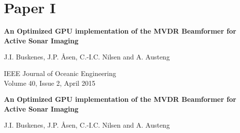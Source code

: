 \ifMonolithic\else\fi


{}



\ifMonolithic\else
   
\fi




\graphicspath{{../HowtoHowtoCapon/submission/final/}}
\ifMonolithic\else\fi
% 
\cleardoublepage
\pagestyle{empty}

{
\setlength\parskip{\baselineskip}
\renewcommand\baselinestretch{1.1}

\chapter{Paper I}\label{ch:paperI}

{\Large\bf An Optimized GPU implementation of the MVDR Beamformer for Active Sonar Imaging}

J.I. Buskenes, J.P. Åsen, C.-I.C. Nilsen and A. Austeng

IEEE Journal of Oceanic Engineering\\
Volume 40, Issue 2, April 2015%
}


\cleardoublepage
\pagestyle{normal}
\thispagestyle{plain}

\begin{center}
{\Large\bf An Optimized GPU implementation of the MVDR Beamformer for Active Sonar Imaging}

\vspace{\baselineskip}
J.I. Buskenes, J.P. Åsen, C.-I.C. Nilsen and A. Austeng
\end{center}

\overfullrule=1mm
{

   
}
   
% 
% 
%    


\ifMonolithic\else\fi